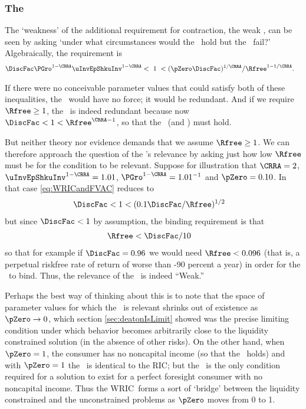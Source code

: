 \documentclass[./BufferStockTheory.tex]{subfiles}
\begin{document}
\subsubsection{The \WRIC}

The `weakness' of the additional requirement for contraction, the
weak \RIC, can be seen by asking `under what circumstances
would the \FVAC~hold but the \WRIC~fail?'
Algebraically, the requirement is
\begin{align}
 \DiscFac \PGro^{1-\CRRA}\uInvEpShkuInv^{1-\CRRA} & < ~ 1 ~ <  (\pZero \DiscFac)^{1/\CRRA}/\Rfree^{1-1/\CRRA}. \label{eq:WRICandFVAC}
\end{align}

If there were no conceivable parameter values that could satisfy both
of these inequalities, the \WRIC~would have no force; it would be
redundant.  And if we require $\Rfree \geq 1$, the \WRIC~is indeed
redundant because now $\DiscFac <1<\Rfree^{\CRRA-1}$, so that the \RIC~(and \WRIC) must hold.

But neither theory nor evidence demands that we assume $\Rfree \geq
1$.  We can therefore approach the question of the \WRIC's relevance by
asking just how low $\Rfree$ must be for the condition to be relevant.
Suppose for illustration that $\CRRA=2$, $\uInvEpShkuInv^{1-\CRRA}=1.01$,
$\PGro^{1-\CRRA}=1.01^{-1}$ and $\pZero = 0.10$.  In that case
\eqref{eq:WRICandFVAC} reduces to
\begin{align}
  \DiscFac  & < 1 < (0.1 \DiscFac/\Rfree)^{1/2} \notag
\end{align}
but since $\DiscFac < 1$ by assumption, the binding requirement is that
\begin{align}
  \Rfree  & < \DiscFac/10 \notag
\end{align}
so that for example if $\DiscFac=0.96$ we would need $\Rfree < 0.096$
(that is, a perpetual riskfree rate of return of worse than -90
percent a year) in order for the \WRIC~to bind.
Thus, the relevance of the \WRIC~is indeed ``Weak.''

Perhaps the best way of thinking about this is to note that the space
of parameter values for which the \WRIC~is relevant shrinks out of
existence as $\pZero \rightarrow 0$, which section
\ref{sec:deatonIsLimit} showed was the precise limiting condition
under which behavior becomes arbitrarily close to the liquidity
constrained solution (in the absence of other risks).  On the other
hand, when $\pZero = 1$, the consumer has no noncapital income (so
that the \FHWC~holds) and with $\pZero=1$ the \WRIC~is identical to the
RIC; but the \RIC~is
 the only condition required for a solution to exist
for a perfect foresight consumer with no noncapital income.  Thus the
WRIC~forms a sort of `bridge' between the liquidity constrained and
the unconstrained problems as $\pZero$ moves from 0 to 1.
\end{document}
